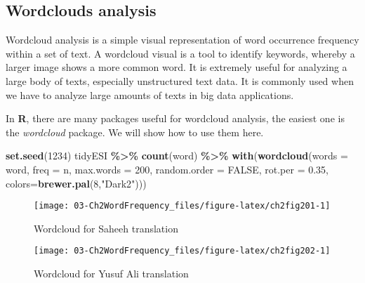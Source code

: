 \documentclass[
]{article}
\newenvironment{Shaded}{\begin{snugshade}}{\end{snugshade}}
\newcommand{\AttributeTok}[1]{\textcolor[rgb]{0.13,0.29,0.53}{#1}}
\newcommand{\ConstantTok}[1]{\textcolor[rgb]{0.56,0.35,0.01}{#1}}
\newcommand{\DecValTok}[1]{\textcolor[rgb]{0.00,0.00,0.81}{#1}}
\newcommand{\FloatTok}[1]{\textcolor[rgb]{0.00,0.00,0.81}{#1}}
\newcommand{\FunctionTok}[1]{\textcolor[rgb]{0.13,0.29,0.53}{\textbf{#1}}}
\newcommand{\NormalTok}[1]{#1}
\newcommand{\SpecialCharTok}[1]{\textcolor[rgb]{0.81,0.36,0.00}{\textbf{#1}}}
\newcommand{\StringTok}[1]{\textcolor[rgb]{0.31,0.60,0.02}{#1}}
\begin{document}
\hypertarget{wordcloud-analysis}{%
\subsection{Wordclouds analysis}\label{wordcloud-analysis}}

Wordcloud analysis is a simple visual representation of word occurrence frequency within a set of text. A wordcloud visual is a tool to identify keywords, whereby a larger image shows a more common word. It is extremely useful for analyzing a large body of texts, especially unstructured text data. It is commonly used when we have to analyze large amounts of texts in big data applications.

In \textbf{R}, there are many packages useful for wordcloud analysis, the easiest one is the \emph{wordcloud} package. We will show how to use them here.

\begin{Shaded}
\begin{Highlighting}[]
\FunctionTok{set.seed}\NormalTok{(}\DecValTok{1234}\NormalTok{)}
\NormalTok{tidyESI }\SpecialCharTok{\%\textgreater{}\%}
  \FunctionTok{count}\NormalTok{(word) }\SpecialCharTok{\%\textgreater{}\%}
  \FunctionTok{with}\NormalTok{(}\FunctionTok{wordcloud}\NormalTok{(}\AttributeTok{words =}\NormalTok{ word, }
                 \AttributeTok{freq =}\NormalTok{ n, }
                 \AttributeTok{max.words =} \DecValTok{200}\NormalTok{,}
                 \AttributeTok{random.order =} \ConstantTok{FALSE}\NormalTok{,}
                 \AttributeTok{rot.per =} \FloatTok{0.35}\NormalTok{,}
                 \AttributeTok{colors=}\FunctionTok{brewer.pal}\NormalTok{(}\DecValTok{8}\NormalTok{,}\StringTok{"Dark2"}\NormalTok{)))}
\end{Highlighting}
\end{Shaded}

\begin{figure}

{\centering \texttt{[image: 03-Ch2WordFrequency\_files/figure-latex/ch2fig201-1]} 

}

\caption{Wordcloud for Saheeh translation}\label{fig:ch2fig201}
\end{figure}

\begin{figure}

{\centering \texttt{[image: 03-Ch2WordFrequency\_files/figure-latex/ch2fig202-1]} 

}

\caption{Wordcloud for Yusuf Ali translation}\label{fig:ch2fig202}
\end{figure}
\end{document}
